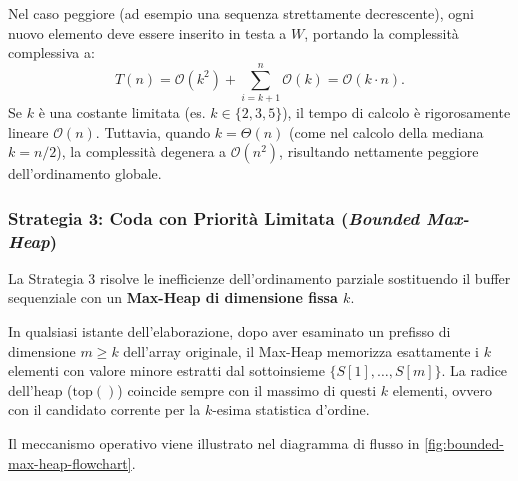 Nel caso peggiore (ad esempio una sequenza strettamente decrescente), ogni nuovo elemento deve essere inserito in testa a $W$, portando la complessità complessiva a:
\begin{equation}
  T(n) = \mathcal{O}(k^2) + \sum_{i=k+1}^n \mathcal{O}(k) = \mathcal{O}(k \cdot n).
\end{equation}
Se $k$ è una costante limitata (es. $k \in \{2, 3, 5\}$), il tempo di calcolo è rigorosamente lineare $\mathcal{O}(n)$. Tuttavia, quando $k = \Theta(n)$ (come nel calcolo della mediana $k = n/2$), la complessità degenera a $\mathcal{O}(n^2)$, risultando nettamente peggiore dell'ordinamento globale.

\subsubsection{Strategia 3: Coda con Priorità Limitata (\textit{Bounded Max-Heap})}
La Strategia 3 risolve le inefficienze dell'ordinamento parziale sostituendo il buffer sequenziale con un \textbf{Max-Heap di dimensione fissa $k$}. 

\begin{property}
In qualsiasi istante dell'elaborazione, dopo aver esaminato un prefisso di dimensione $m \ge k$ dell'array originale, il Max-Heap memorizza esattamente i $k$ elementi con valore minore estratti dal sottoinsieme $\{S[1], \dots, S[m]\}$. La radice dell'heap ($\text{top}()$) coincide sempre con il massimo di questi $k$ elementi, ovvero con il candidato corrente per la $k$-esima statistica d'ordine.
\end{property}

Il meccanismo operativo viene illustrato nel diagramma di flusso in \autoref{fig:bounded-max-heap-flowchart}.

